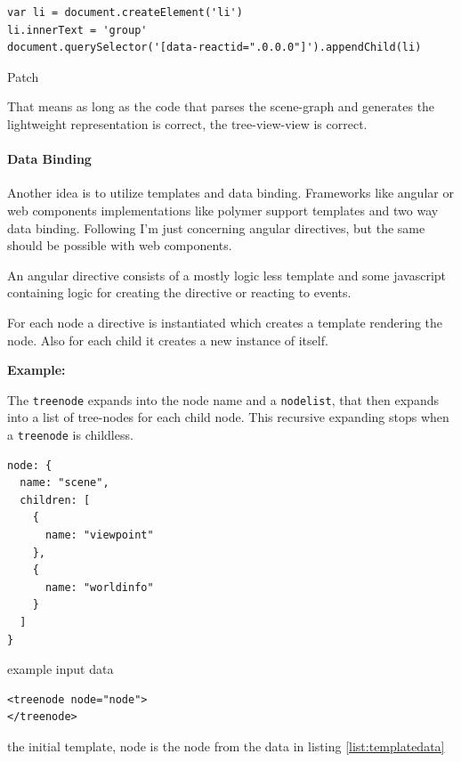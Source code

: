 \begin{listing}[H]
  \begin{verbatim}
var li = document.createElement('li')
li.innerText = 'group'
document.querySelector('[data-reactid=".0.0.0"]').appendChild(li)
  \end{verbatim}
  \caption{Patch}
\end{listing}

That means as long as the code that parses the scene-graph and generates
the lightweight representation is correct, the tree-view-view is
correct.

\paragraph{Data Binding}
\label{data-binding}

Another idea is to utilize templates and data binding. Frameworks like
angular or web components implementations like polymer
support templates and two way data binding. Following I'm just
concerning angular directives, but the same should be possible with web
components.

An angular directive consists of a mostly logic less template and some
javascript containing logic for creating the directive or reacting to
events.

For each node a directive is instantiated which creates a template
rendering the node. Also for each child it creates a new instance of
itself.

\textbf{Example:}

The \texttt{treenode} expands into the node name and a \texttt{nodelist},
that then expands into a list of tree-nodes for each child node.
This recursive expanding stops when a \texttt{treenode} is childless.

\begin{listing}[H]
  \begin{verbatim}
node: {
  name: "scene",
  children: [
    {
      name: "viewpoint"
    },
    {
      name: "worldinfo"
    }
  ]
}
  \end{verbatim}
  \caption{example input data}
  \label{list:templatedata}
\end{listing}

\begin{listing}[H]
  \begin{verbatim}
<treenode node="node">
</treenode>
  \end{verbatim}
  \caption{the initial template, node is the node from the data in listing \ref{list:templatedata}}
\end{listing}

